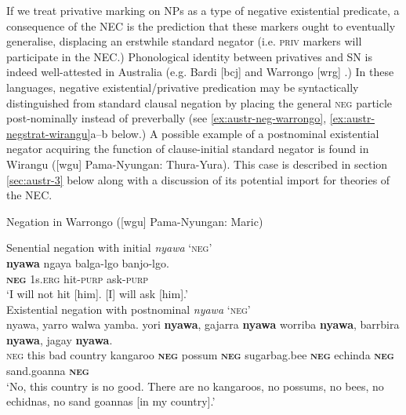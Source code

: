 \documentclass[output=paper]{langsci/langscibook}
\begin{document}
If we treat privative marking on NPs as a type of negative existential
    predicate, a consequence of the NEC is the prediction that these
    markers ought to eventually generalise, displacing an erstwhile
    standard negator (i.e. \textsc{priv}  markers will participate in the
    NEC.) Phonological identity between privatives and SN is indeed
    well-attested in Australia (e.g. Bardi [bcj] \citep{Bowern2012} and
    Warrongo [wrg] \citep{Tsunoda2011}.) In these languages, negative
    existential\slash privative predication may be syntactically distinguished
    from standard clausal negation by placing the general \textsc{neg}
    particle post-nominally instead of preverbally (see
    \ref{ex:austr-neg-warrongo},
    \ref{ex:austr-negstrat-wirangu}a--b below.) A possible example of a postnominal
    existential negator acquiring the function of clause-initial standard
    negator is found in Wirangu ([wgu] Pama-Nyungan: Thura-Yura).
    This case is described in section \ref{sec:austr-3} below along with a
    discussion of its potential import for theories of the NEC.

    \begin{exe}\ex\label{ex:austr-neg-warrongo} Negation in Warrongo ([wgu] Pama-Nyungan: Maric)
        \begin{xlist}
\ex Senential negation with initial \textit{nyawa} `\textsc{neg}'\\
\gll \textbf{nyawa} ngaya balga-lgo banjo-lgo.\\
\textsc{\textbf{neg}} 1s\textsc{.erg} hit\textsc{-purp} ask\textsc{-purp}\\
\glt `I will not hit [him]. [I] will ask [him].'\hfill\citep[363]{Tsunoda2011}\\
%
\ex Existential negation with postnominal \textit{nyawa} `\textsc{neg}'\\
\gll nyawa, yarro walwa yamba. yori \textbf{nyawa}, gajarra \textbf{nyawa} worriba \textbf{nyawa}, barrbira \textbf{nyawa}, jagay \textbf{nyawa}.\\
\textsc{neg} this bad country kangaroo \textsc{\textbf{neg}} possum \textbf{\textsc{neg}} sugarbag.bee \textbf{\textsc{neg}} echinda \textbf{\textsc{neg}} sand.goanna \textbf{\textsc{neg}}\\
\glt `No, this country is no good. There are no kangaroos, no possums, no
            bees, no echidnas, no sand goannas [in my country].'\\
            \hfill\citep[661]{Tsunoda2011}\\
        \end{xlist}\end{exe}
\end{document}
